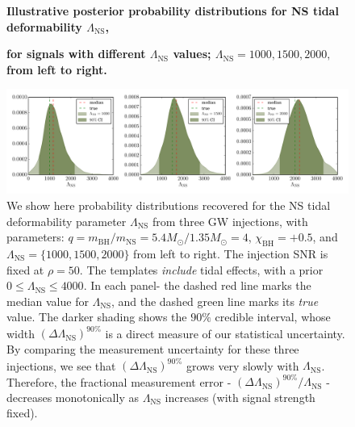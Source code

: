 \documentclass[aps,prd,amsmath,floats,floatfix, twocolumn,
superscriptaddress,nofootinbib,showpacs]{revtex4-1}
\newcommand{\lambdans}{\Lambda_\mathrm{NS}}
\newcommand{\chibh}{\chi_\mathrm{BH}}
\newcommand{\mbh}{m_\mathrm{BH}}
\newcommand{\mns}{m_\mathrm{NS}}
\begin{document}
\begin{figure}
\centering 
\textbf{Illustrative posterior probability distributions for NS tidal
deformability $\lambdans$,}\par
\textbf{for signals with different $\lambdans$ values; $\lambdans = 1000,1500,2000,$
from left to right.}\par\medskip
\includegraphics[width=1.9\columnwidth]{plots/SingleSystemLambdaVary_q4_0_mc2_25_chi0_50_snr50}
\caption{We show here probability distributions recovered for the NS tidal
deformability parameter $\lambdans$ from three GW injections, with parameters:
$q = \mbh/\mns = 5.4M_\odot/1.35M_\odot = 4$, $\chibh=+0.5$, and 
$\lambdans=\{1000,1500,2000\}$ from left to right. The injection SNR is fixed at
$\rho=50$. The templates {\it include} tidal effects, with a prior $0\leq\lambdans\leq 4000$.
% 
In each panel- the dashed red line marks the median value for
$\lambdans$, and the dashed green line marks its {\it true} value.
The darker shading shows the $90\%$ credible interval, whose width
$(\Delta\lambdans)^{90\%}$ is a direct measure of our statistical uncertainty.
By comparing the measurement uncertainty for these three injections, we see
that $(\Delta\lambdans)^{90\%}$ grows very slowly with $\lambdans$. Therefore,
the fractional measurement error - $(\Delta\lambdans)^{90\%}/\lambdans$ -
decreases monotonically as $\lambdans$ increases (with signal strength fixed).
% 
}
\label{fig:SingleSystemLambdaPDFvsSNR}
\end{figure}
\end{document}
